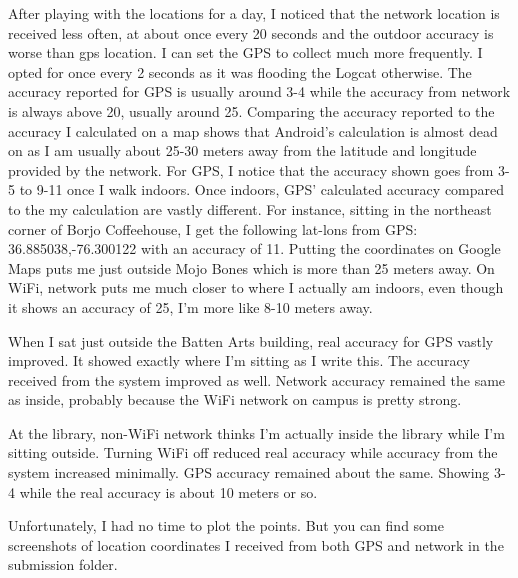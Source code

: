 \documentclass{article}
\begin{document}
After playing with the locations for a day, I noticed that the network location is received less often, at about once every 20 seconds and the outdoor accuracy is  worse than gps location. I can set the GPS to collect much more frequently. I opted for once every 2 seconds as it was flooding the Logcat otherwise. The accuracy reported for GPS is usually around 3-4 while the accuracy from network is always above 20, usually around 25. Comparing the accuracy reported to the accuracy I calculated on a map shows that Android's calculation is almost dead on as I am usually about 25-30 meters away from the latitude and longitude provided by the network. For GPS, I notice that the accuracy shown goes from 3-5 to 9-11 once I walk indoors. Once indoors, GPS' calculated accuracy compared to the my calculation are vastly different. For instance, sitting in the northeast corner of Borjo Coffeehouse, I get the following lat-lons from GPS: 36.885038,-76.300122 with an accuracy of 11. Putting the coordinates on Google Maps puts me just outside Mojo Bones which is more than 25 meters away. On WiFi, network puts me much closer to where I actually am indoors, even though it shows an accuracy of 25, I'm more like 8-10 meters away. 
\hfill \linebreak

When I sat just outside the Batten Arts building, real accuracy for GPS vastly improved. It showed exactly where I'm sitting as I write this. The accuracy received from the system improved as well. Network accuracy remained the same as inside, probably because the WiFi network on campus is pretty strong. 
\hfill \linebreak

At the library, non-WiFi network thinks I'm actually inside the library while I'm sitting outside. Turning WiFi off reduced real accuracy while accuracy from the system increased minimally. GPS accuracy remained about the same. Showing 3-4 while the real accuracy is about 10 meters or so.
\hfill \linebreak

Unfortunately, I had no time to plot the points. But you can find some screenshots of location coordinates I received from both GPS and network in the submission folder.
\end{document}
